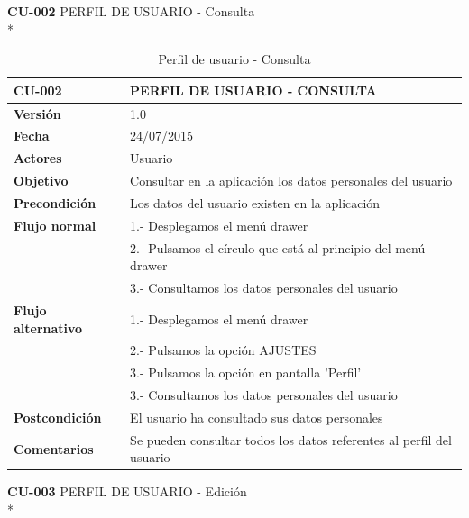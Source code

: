 \documentclass[../pfc.tex]{subfiles}
\begin{document}
	\textbf{CU-002}	PERFIL DE USUARIO - Consulta\\*
	
	\begin{table}[H]
		\centering
		\begin{tabular}[t]{|p{3cm}|p{9.5cm}|}
			\hline \textbf{CU-002} & \textbf{PERFIL DE USUARIO - CONSULTA} \\*
			\hline\hline \textbf{Versión} & 1.0 \\*
			\hline\hline \textbf{Fecha} & 24/07/2015 \\*
			\hline\textbf{Actores} 	& Usuario\\*
			\hline \textbf{Objetivo} & Consultar en la aplicación los datos personales del usuario\\* 			
			\hline \textbf{Precondición} & Los datos del usuario existen en la aplicación \\* 
			\hline \textbf{Flujo normal} & 1.- Desplegamos el menú drawer\\* 
			& 2.- Pulsamos el círculo que está al principio del menú drawer\\*	
			& 3.- Consultamos los datos personales del usuario\\*	
			\hline \textbf{Flujo alternativo} & 1.- Desplegamos el menú drawer\\* 
			& 2.- Pulsamos la opción AJUSTES \\*	
			& 3.- Pulsamos la opción en pantalla 'Perfil' \\*	
			& 3.- Consultamos los datos personales del usuario \\*	
			\hline \textbf{Postcondición} & El usuario ha consultado sus datos personales\\* 
			\hline \textbf{Comentarios}   & Se pueden consultar todos los datos referentes al perfil del usuario\\*
			\hline
		\end{tabular}
		\caption{Perfil de usuario - Consulta}
		\label{tabla:caso002}
	\end{table}
	
	\clearpage
	
	\textbf{CU-003} PERFIL DE USUARIO - Edición\\*
	
\end{document}
